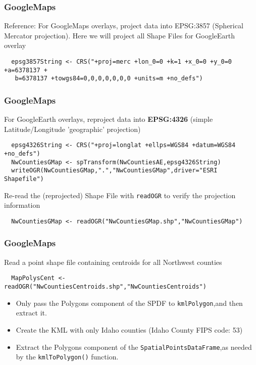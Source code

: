 \documentclass{beamer}
\begin{document}
\begin{frame}[fragile]
\frametitle{GoogleMaps}
Reference: For GoogleMaps overlays, project data into EPSG:3857 (Spherical Mercator projection).
Here we will project all Shape Files for GoogleEarth overlay   
\begin{framed}
\begin{verbatim}
  epsg3857String <- CRS("+proj=merc +lon_0=0 +k=1 +x_0=0 +y_0=0 +a=6378137 +
   b=6378137 +towgs84=0,0,0,0,0,0,0 +units=m +no_defs") 
\end{verbatim}
\end{framed}   
\end{frame}
\begin{frame}[fragile]
\frametitle{GoogleMaps}
For GoogleEarth overlays, reproject data into \textbf{EPSG:4326} (simple Latitude/Longitude 'geographic' projection)
\begin{framed}
\begin{verbatim}
  epsg4326String <- CRS("+proj=longlat +ellps=WGS84 +datum=WGS84 +no_defs")
  NwCountiesGMap <- spTransform(NwCountiesAE,epsg4326String)
  writeOGR(NwCountiesGMap,".","NwCountiesGMap",driver="ESRI Shapefile")  
\end{verbatim}
\end{framed}
\end{frame}
\begin{frame}[fragile]
Re-read the (reprojected) Shape File with \texttt{readOGR} to verify the projection information
\begin{framed}
\begin{verbatim}
  NwCountiesGMap <- readOGR("NwCountiesGMap.shp","NwCountiesGMap")
\end{verbatim}
\end{framed}
\end{frame}
\begin{frame}[fragile]
\frametitle{GoogleMaps}

Read a point shape file containing centroids for all Northwest counties 

\begin{framed}
\begin{verbatim}
  MapPolysCent <- readOGR("NwCountiesCentroids.shp","NwCountiesCentroids")
\end{verbatim}
\end{framed}
\begin{itemize}
\item Only pass the Polygons component of the SPDF to \texttt{kmlPolygon},and then extract it.
\item Create the KML with only Idaho counties (Idaho County FIPS code: 53)
\item Extract the Polygons component of the \texttt{SpatialPointsDataFrame},as needed by the \texttt{kmlToPolygon()} function.
\end{itemize}
\end{frame}
\end{document}
